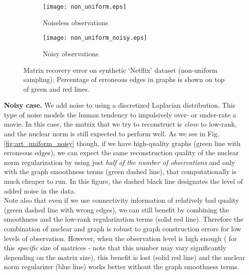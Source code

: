 \documentclass{article}
\begin{document}
\begin{figure}
\label{fig:art_non_uniform_all}
          \begin{subfigure}[b]{.5\linewidth}
            \centering \texttt{[image: non\_uniform.eps]}
            \caption{Noiseless observations}\label{fig:art_non_uniform}
          \end{subfigure}
          \begin{subfigure}[b]{.5\linewidth}
            \centering\texttt{[image: non\_uniform\_noisy.eps]}
            \caption{Noisy observations}\label{fig:art_non_uniform_noisy}
          \end{subfigure}

        \caption{Matrix recovery error on synthetic `Netflix' dataset (non-uniform sampling). Percentage of erroneous edges in graphs is shown on top of green and red lines.}
	\vspace{-0.45cm}
\end{figure}
{\bf Noisy case. } We add noise to  using a discretized Laplacian distribution. This type of noise models the human tendency to impulsively over- or under-rate a movie. In this case, the matrix that we try to reconstruct is \textit{close} to low-rank, and the nuclear norm is still expected to perform well. As we see in Fig. \ref{fig:art_uniform_noisy} though, if we have high-quality graphs (green line with  erroneous edges), we can expect the same reconstruction quality of the nuclear norm regularization by using just \textit{half of the number of observations} and only with the graph smoothness terms (green dashed line), that computationally is much cheaper to run. In this figure, the dashed black line designates the level of added noise in the data.\\
Note also that even if we use connectivity information of relatively bad quality (green dashed line with  wrong edges), we can still benefit by combining the smoothness and the low-rank regularization terms (solid red line). Therefore the combination of nuclear and graph is robust to graph construction errors for low levels of observation. However, when the observation level is high enough ( for this \textit{specific} size of matrices - note that this number may vary significantly depending on the matrix size), this benefit is lost (solid red line) and the nuclear norm regularizer (blue line) works better without the graph smoothness terms.
\end{document}
